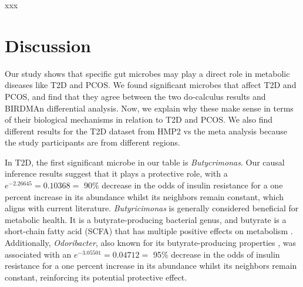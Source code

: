 \documentclass[12pt,letterpaper]{article}
\begin{document}
xxx

\section{Discussion}

Our study shows that specific gut microbes may play a direct role in metabolic diseases like T2D and PCOS. We found significant microbes that affect T2D and PCOS, and find that they agree between the two do-calculus results and BIRDMAn differential analysis. Now, we explain why these make sense in terms of their biological mechanisms in relation to T2D and PCOS. We also find different results for the T2D dataset from HMP2 vs the meta analysis because the study participants are from different regions. 

In T2D, the first significant microbe in our table is \textit{Butycrimonas}. Our causal inference results suggest that it plays a protective role, with a $e^{-2.26645} = 0.10368 =$ 90\% decrease in the odds of insulin resistance for a one percent increase in its abundance whilst its neighbors remain constant, which aligns with current literature. \textit{Butyricimonas} is generally considered beneficial for metabolic health. It is a butyrate-producing bacterial genus, and butyrate is a short-chain fatty acid (SCFA) that has multiple positive effects on metabolism \citep{lee2022butyricimonas}. Additionally, \textit{Odoribacter}, also known for its butyrate-producing properties \citep{albataineh2023odoribacter}, was associated with an $e^{-3.05501} = 0.04712 =$ 95\% decrease in the odds of insulin resistance for a one percent increase in its abundance whilst its neighbors remain constant, reinforcing its potential protective effect.
\end{document}
